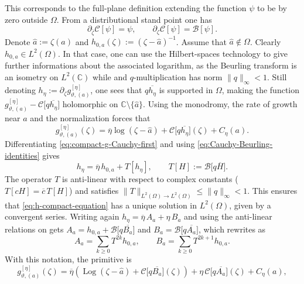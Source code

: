 \documentclass[reqno]{amsart}
\numberwithin{equation}{section}
\theoremstyle{definition}
\theoremstyle{remark}
\newcommand\C{\mathbb{C}}
\providecommand{\Log}{\operatorname{Log}}
\providecommand{\hata}{\widehat a}
\begin{document}
This corresponds to the full-plane definition extending the function $\psi$ to be by zero outside $\Omega$. From a distributional stand point one has
\begin{equation}\label{eq:Cauchy-Beurling-identities}
        \partial_{\bar\zeta}\mathcal C[\psi]=\psi,
        \qquad
        \partial_\zeta\mathcal C[\psi]=\mathcal B[\psi].
\end{equation}
Denote $\hata:=\zeta(a)$ and $ h_{0,a}(\zeta):= (\zeta-\hata)^{-1}$. Assume that $\hata\notin\Omega$. Clearly $h_{0,a}\in L^2(\Omega)$. In that case, one can use the Hilbert-spaces technology to give further informations about the associated logarithm, as the Beurling transform is an isometry on $L^2(\C)$ while and $q$-multiplication has norm
$\|q\|_\infty<1$. Still denoting $ h_\eta:=\partial_\zeta g^{[\eta]}_{\vartheta,(a)}$, one sees that $q\overline{h_\eta}$ is supported in $\Omega$, making the function $ g^{[\eta]}_{\vartheta,(a)} - \mathcal C\bigl[q\overline{h_\eta}\bigr]$ holomorphic on $\C\setminus\{\hata\}$. Using the monodromy, the rate of growth near $a$ and the normalization forces that \begin{equation}\label{eq:compact-g-Cauchy-first}
        g^{[\eta]}_{\vartheta,(a)}(\zeta)
        =
        \overline\eta\log(\zeta-\hata)
        +
        \mathcal C\bigl[q\overline{h_\eta}\bigr](\zeta)
        +
        C_\eta(a).
\end{equation}
Differentiating \eqref{eq:compact-g-Cauchy-first} and using
\eqref{eq:Cauchy-Beurling-identities} gives
\begin{equation}\label{eq:h-compact-equation}
        h_\eta=\overline\eta\,h_{0,a}+T[h_\eta],
        \qquad
        T[H]:=\mathcal B\bigl[q\overline H\bigr].
\end{equation}
The operator $T$ is anti-linear with respect to complex constants ($T[cH]=\overline c\,T[H]$) and satisfies $ \|T\|_{L^2(\Omega)\to L^2(\Omega)}\leq \|q\|_\infty<1$. This ensures that \eqref{eq:h-compact-equation} has a unique solution in $L^2(\Omega)$,
given by a convergent series. Writing again $ h_\eta=\overline\eta\,A_a+\eta\,B_a$ and using the anti-linear relations on gets $  A_a=h_{0,a}+\mathcal B\bigl[q\overline{B_a}\bigr]$ and $ B_a=\mathcal B\bigl[q\overline{A_a}\bigr]$, which rewrites as 
\begin{equation}\label{eq:A-B-compact-series}
        A_a=\sum_{k\geq0}T^{2k}h_{0,a},
        \qquad
        B_a=\sum_{k\geq0}T^{2k+1}h_{0,a}.
\end{equation}
With this notation, the primitive is
\begin{equation}\label{eq:g-compact-eta}
        g^{[\eta]}_{\vartheta,(a)}(\zeta)
        =
        \overline\eta
        \left(
        \Log(\zeta-\hata)
        +
        \mathcal C\bigl[q\overline{B_a}\bigr](\zeta)
        \right)
        +
        \eta\,\mathcal C\bigl[q\overline{A_a}\bigr](\zeta)
        +
        C_\eta(a), 
\end{equation}
\end{document}
